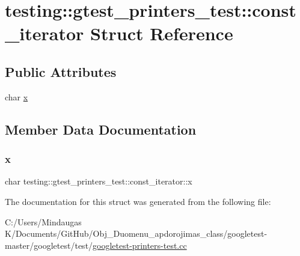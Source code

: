 \hypertarget{structtesting_1_1gtest__printers__test_1_1const__iterator}{}\section{testing\+::gtest\+\_\+printers\+\_\+test\+::const\+\_\+iterator Struct Reference}
\label{structtesting_1_1gtest__printers__test_1_1const__iterator}
\subsection*{Public Attributes}
\begin{DoxyCompactItemize}
\item 
char \mbox{\hyperlink{structtesting_1_1gtest__printers__test_1_1const__iterator_a4412dbc1c37c2bc5211971f0c8176d6b}{x}}
\end{DoxyCompactItemize}


\subsection{Member Data Documentation}
\mbox{\label{structtesting_1_1gtest__printers__test_1_1const__iterator_a4412dbc1c37c2bc5211971f0c8176d6b}} 
\subsubsection{\texorpdfstring{x}{x}}
{\footnotesize\ttfamily char testing\+::gtest\+\_\+printers\+\_\+test\+::const\+\_\+iterator\+::x}



The documentation for this struct was generated from the following file\+:\begin{DoxyCompactItemize}
\item 
C\+:/\+Users/\+Mindaugas K/\+Documents/\+Git\+Hub/\+Obj\+\_\+\+Duomenu\+\_\+apdorojimas\+\_\+class/googletest-\/master/googletest/test/\mbox{\hyperlink{googletest-master_2googletest_2test_2googletest-printers-test_8cc}{googletest-\/printers-\/test.\+cc}}\end{DoxyCompactItemize}
